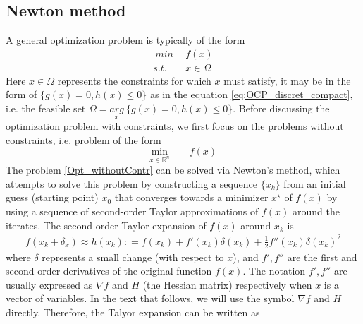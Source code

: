 \documentclass  [
  paper    = a4,
  BCOR     = 10mm,
  twoside,
  fontsize = 12pt,
  fleqn,
  toc      = bibnumbered,
  toc      = listofnumbered,
  numbers  = noendperiod,
  headings = normal,
  listof   = leveldown,
  version  = 3.03
]                                       {scrreprt}
\newcommand{\<}{\langle}
\renewcommand{\>}{\rangle}
\begin{document}


\subsection{Newton method}
A general optimization problem is typically of the form 
\begin{equation}
	\begin{aligned}
		\    min &\ \   f(x) \\
		s.t.  & \ \ x \in \Omega
	\end{aligned}
	\label{OptGen}
\end{equation}
Here $x \in \Omega$ represents the constraints for which $x$ must satisfy, it may be in the form of $\{g(x) = 0,  h(x)  \leq  0 \}$ as in the equation \ref{eq:OCP_discret_compact}, i.e. the feasible set $\Omega = \underset{x}{arg} \ \{ g(x) = 0,  h(x)  \leq  0 \}$. Before discussing the optimization problem with constraints, we first focus on the problems without constraints, i.e. problem of the form
\begin{equation}
	\underset{x \in \mathbb{R}^n}{\text{min}} \qquad f(x)	
	\label{Opt_withoutContr}
\end{equation}
The problem \ref{Opt_withoutContr} can be solved via Newton's method, which attempts to solve this problem by constructing a sequence $\{x_k\}$ from an initial guess (starting point) $x_0$ that converges towards a minimizer $x^\star$ of $f(x)$  by using a sequence of second-order Taylor approximations of $f(x)$ around the iterates. The second-order Taylor expansion of $f(x)$ around $x_k$ is
\begin{align*}
	f(x_k + \delta_x) \approx h(x_k) : = f(x_k) + f'(x_k)\delta(x_k) +\frac{1}{2}f''(x_k)\delta(x_k)^2 
\end{align*}
where $\delta$ represents a small change (with respect to $x$), and $f', f''$ are the first and second order derivatives of the original function $f(x)$. The notation $f', f''$ are usually expressed as $\nabla f$ and  $H$ (the Hessian matrix) respectively when $x$ is a vector of variables. In the text that follows, we will use the symbol $\nabla f$ and $H$ directly. Therefore, the Talyor expansion can be written as 
\end{document}
